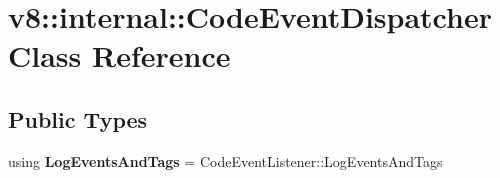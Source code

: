 \hypertarget{classv8_1_1internal_1_1CodeEventDispatcher}{}\section{v8\+:\+:internal\+:\+:Code\+Event\+Dispatcher Class Reference}
\label{classv8_1_1internal_1_1CodeEventDispatcher}
\subsection*{Public Types}
\begin{DoxyCompactItemize}
\item 
\mbox{\label{classv8_1_1internal_1_1CodeEventDispatcher_abcedfa15154947198f2b51d57bd051e6}} 
using {\bfseries Log\+Events\+And\+Tags} = Code\+Event\+Listener\+::\+Log\+Events\+And\+Tags
\end{DoxyCompactItemize}

